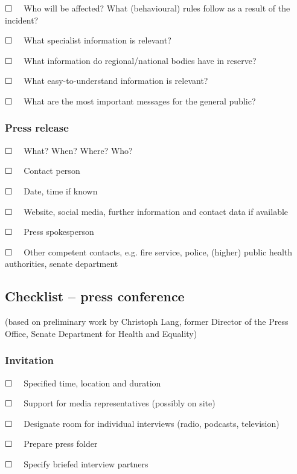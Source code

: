 \documentclass{article}
\begin{document}
☐   Who will be affected? What (behavioural) rules follow as a result of the incident?


☐   What specialist information is relevant?


☐   What information do regional/national bodies have in reserve?


☐   What easy-to-understand information is relevant? 


☐   What are the most important messages for the general public?


\subsubsection{Press release}\label{H7689813}



☐   What? When? Where? Who? 


☐   Contact person 


☐   Date, time if known


☐   Website, social media, further information and contact data if available 


☐   Press spokesperson


☐   Other competent contacts, e.g. fire service, police, (higher) public health authorities, senate department





\subsection{Checklist – press conference}\label{H59697}



(based on preliminary work by Christoph Lang, former Director of the Press Office, Senate Department for Health and Equality)


\subsubsection{Invitation}\label{H6901633}



☐   Specified time, location and duration 


☐   Support for media representatives (possibly on site)


☐   Designate room for individual interviews (radio, podcasts, television)


☐   Prepare press folder


☐   Specify briefed interview partners
\end{document}
